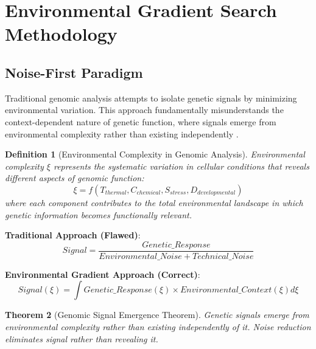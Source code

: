 \documentclass[12pt,a4paper]{article}
\newtheorem{theorem}{Theorem}[section]
\newtheorem{definition}[theorem]{Definition}
\begin{document}
\section{Environmental Gradient Search Methodology}

\subsection{Noise-First Paradigm}

Traditional genomic analysis attempts to isolate genetic signals by minimizing environmental variation. This approach fundamentally misunderstands the context-dependent nature of genetic function, where signals emerge from environmental complexity rather than existing independently \cite{dunn2011procedures, creek2014metabolome}.

\begin{definition}[Environmental Complexity in Genomic Analysis]
Environmental complexity $\xi$ represents the systematic variation in cellular conditions that reveals different aspects of genomic function:
\begin{equation}
\xi = f(T_{thermal}, C_{chemical}, S_{stress}, D_{developmental})
\end{equation}
where each component contributes to the total environmental landscape in which genetic information becomes functionally relevant.
\end{definition}

\textbf{Traditional Approach (Flawed)}:
\begin{equation}
Signal = \frac{Genetic\_Response}{Environmental\_Noise + Technical\_Noise}
\end{equation}

\textbf{Environmental Gradient Approach (Correct)}:
\begin{equation}
Signal(\xi) = \int Genetic\_Response(\xi) \times Environmental\_Context(\xi) d\xi
\end{equation}

\begin{theorem}[Genomic Signal Emergence Theorem]
Genetic signals emerge from environmental complexity rather than existing independently of it. Noise reduction eliminates signal rather than revealing it.
\end{theorem}
\end{document}

